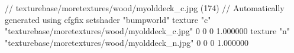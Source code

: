 // texturebase/moretextures/wood/myolddeck_c.jpg (174)
// Automatically generated using cfgfix
setshader "bumpworld"
texture "c" "texturebase/moretextures/wood/myolddeck_c.jpg" 0 0 0 1.000000
texture "n" "texturebase/moretextures/wood/myolddeck_n.jpg" 0 0 0 1.000000
